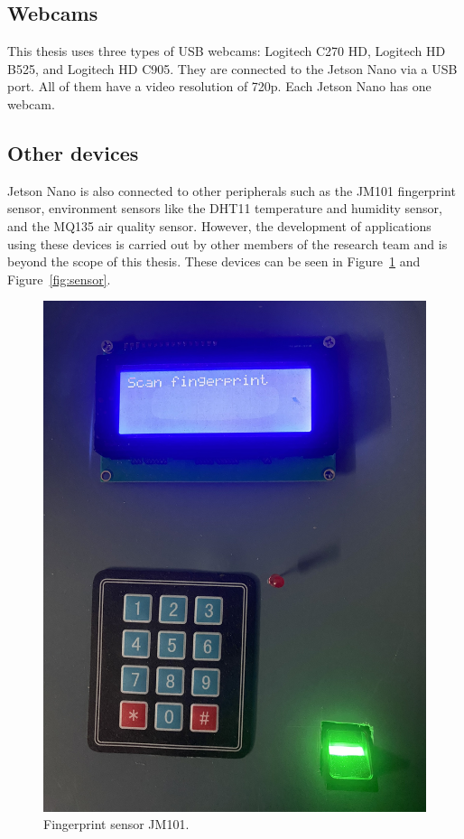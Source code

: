 \documentclass[../main.tex]{subfiles}
\begin{document}
\subsection{Webcams}
This thesis uses three types of USB webcams: Logitech C270 HD, Logitech HD B525, and Logitech HD C905. They are connected to the Jetson Nano via a USB port. All of them have a video resolution of 720p. Each Jetson Nano has one webcam.

\subsection{Other devices}
Jetson Nano is also connected to other peripherals such as the JM101 fingerprint sensor, environment sensors like the DHT11 temperature and humidity sensor, and the MQ135 air quality sensor. However, the development of applications using these devices is carried out by other members of the research team and is beyond the scope of this thesis. These devices can be seen in Figure~\ref{fig:finger} and Figure~\ref{fig:sensor}.

\begin{figure}[h!]
\centering
\includegraphics[width=0.6\linewidth]{Figure/finger.jpg}
\caption{Fingerprint sensor JM101.}
\label{fig:finger}
\end{figure}
\end{document}
